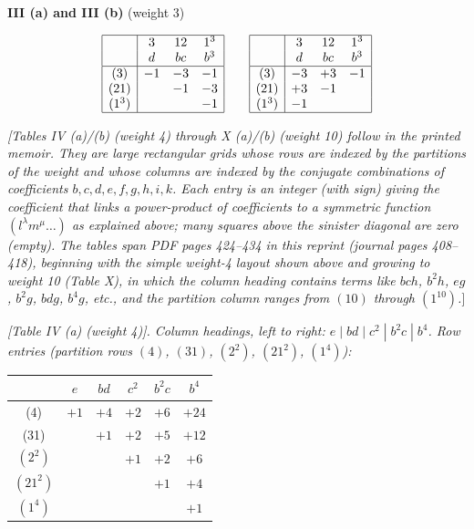 \documentclass[11pt]{article}
\begin{document}
\medskip

\begin{center}\textbf{III (a) and III (b)} (weight 3)\end{center}
\[
\begin{array}{|c|ccc|}
\hline
   & 3 & 12 & 1^3 \\
   & d & bc & b^3 \\ \hline
(3)   & -1 & -3 & -1 \\
(21)  &    & -1 & -3 \\
(1^3) &    &    & -1 \\ \hline
\end{array}
\qquad
\begin{array}{|c|ccc|}
\hline
   & 3 & 12 & 1^3 \\
   & d & bc & b^3 \\ \hline
(3)   & -3 & +3 & -1 \\
(21)  & +3 & -1 &    \\
(1^3) & -1 &    &    \\ \hline
\end{array}
\]

\bigskip

\noindent\textit{[Tables IV (a)/(b) (weight 4) through X (a)/(b) (weight 10) follow in the printed memoir. They are large rectangular grids whose rows are indexed by the partitions of the weight and whose columns are indexed by the conjugate combinations of coefficients $b, c, d, e, f, g, h, i, k$. Each entry is an integer (with sign) giving the coefficient that links a power-product of coefficients to a symmetric function $(l^\lambda m^\mu\ldots)$ as explained above; many squares above the sinister diagonal are zero (empty). The tables span PDF pages 424--434 in this reprint (journal pages 408--418), beginning with the simple weight-4 layout shown above and growing to weight 10 (Table X), in which the column heading contains terms like $bch$, $b^2 h$, $eg$, $b^2 g$, $bdg$, $b^4 g$, etc., and the partition column ranges from $(10)$ through $(1^{10})$.}]

\medskip

\noindent\textit{[Table IV (a) (weight 4)]. Column headings, left to right: $e\;|\;bd\;|\;c^2\;|\;b^2 c\;|\;b^4$. Row entries (partition rows $(4)$, $(31)$, $(2^2)$, $(21^2)$, $(1^4)$):}
\begin{center}
\begin{tabular}{|c|ccccc|}
\hline
   & $e$ & $bd$ & $c^2$ & $b^2 c$ & $b^4$ \\ \hline
(4)    & $+1$ & $+4$ & $+2$ & $+6$ & $+24$\\
(31)   &      & $+1$ & $+2$ & $+5$ & $+12$ \\
$(2^2)$ &      &      & $+1$ & $+2$ & $+6$ \\
$(21^2)$ &     &      &      & $+1$ & $+4$ \\
$(1^4)$ &     &      &      &       & $+1$ \\ \hline
\end{tabular}
\end{center}
\end{document}
